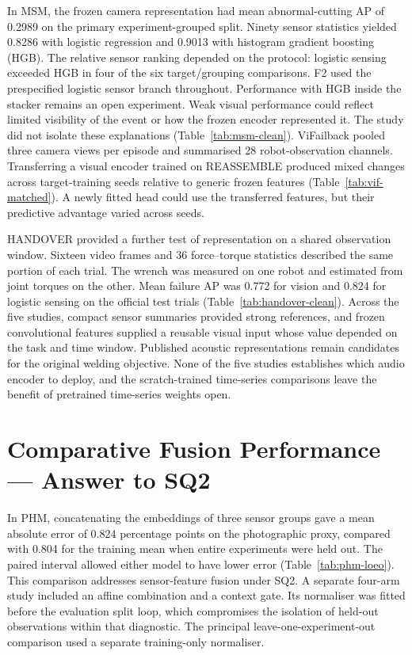 In MSM, the frozen camera representation had mean abnormal-cutting AP of 0.2989 on the
primary experiment-grouped split. Ninety sensor statistics yielded 0.8286 with logistic
regression and 0.9013 with histogram gradient boosting (HGB). The relative sensor ranking
depended on the protocol: logistic sensing exceeded HGB in four of the six
target/grouping comparisons. F2 used the prespecified logistic sensor branch throughout.
Performance with HGB inside the stacker remains an open experiment.
Weak visual performance could reflect limited
visibility of the event or how the frozen encoder represented it. The study did not
isolate these explanations (Table~\ref{tab:msm-clean}). ViFailback pooled three camera
views per episode and summarised 28 robot-observation channels. Transferring a visual
encoder trained on REASSEMBLE produced mixed changes across target-training seeds
relative to generic frozen features (Table~\ref{tab:vif-matched}). A newly fitted head
could use the transferred features, but their predictive advantage varied across seeds.

HANDOVER provided a further test of representation on a shared observation window.
Sixteen video frames and 36 force--torque statistics described the same portion of each
trial. The wrench was measured on one robot and estimated from joint torques on the
other. Mean failure AP was 0.772 for vision and 0.824 for logistic sensing on the official
test trials (Table~\ref{tab:handover-clean}). Across the five studies, compact sensor
summaries provided strong references, and frozen convolutional features supplied a
reusable visual input whose value depended on the task and time window. Published
acoustic representations remain candidates for the original welding objective. None of
the five studies establishes which audio encoder to deploy, and the scratch-trained
time-series comparisons leave the benefit of pretrained time-series weights open.

\section{Comparative Fusion Performance --- Answer to SQ2}
\label{sec:discussion-fusion}
In PHM, concatenating the embeddings of three sensor groups gave a mean absolute error
of 0.824 percentage points on the photographic proxy, compared with 0.804 for the
training mean when entire experiments were held out. The paired interval allowed either
model to have lower error (Table~\ref{tab:phm-loeo}). This comparison addresses
sensor-feature fusion under SQ2. A separate four-arm study included an affine
combination and a context gate. Its normaliser was fitted before the evaluation split
loop, which compromises the isolation of held-out observations within that diagnostic.
The principal leave-one-experiment-out comparison used a separate training-only
normaliser.

